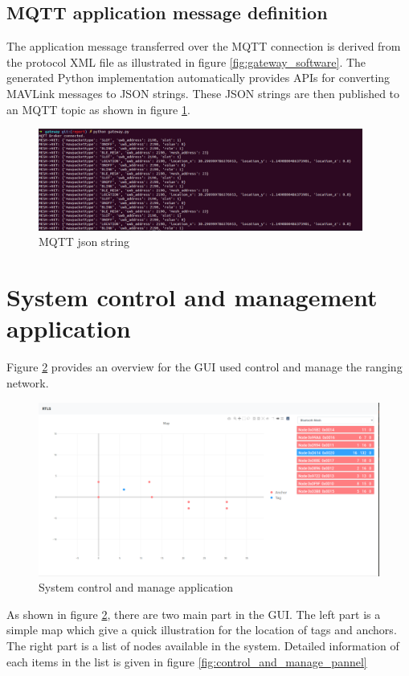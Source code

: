 \documentclass[\main/main.tex]{subfiles}
\begin{document}
\subsection{MQTT application message definition}
The application message transferred over the MQTT connection is derived from the protocol XML file as illustrated in figure \ref{fig:gateway_software}. The generated Python implementation automatically provides APIs for converting MAVLink messages to JSON strings.  These JSON strings are then published to an MQTT topic as shown in figure \ref{fig:mqtt_json_string}.

\begin{figure}[H]
    \begin{center}
        \includegraphics[width=0.95\textwidth]{mqtt_json_string.png}
    \end{center}
    \caption{MQTT json string}
    \label{fig:mqtt_json_string}
\end{figure}

\section{System control and management application}
Figure \ref{fig:system_control_and_manage_application} provides an overview for the GUI used control and manage the ranging network.
\begin{figure}[H]   
    \centering
    \includegraphics[width=1\textwidth]{system_control_and_manage_application.png}
    \caption{System control and manage application}
    \label{fig:system_control_and_manage_application}
\end{figure}
As shown in figure \ref{fig:system_control_and_manage_application}, there are two main part in the GUI. The left part is a simple map which give a quick illustration for the location of tags and anchors. The right part is a list of nodes available in the system. Detailed information of each items in the list is given in figure \ref{fig:control_and_manage_pannel}
\end{document}
